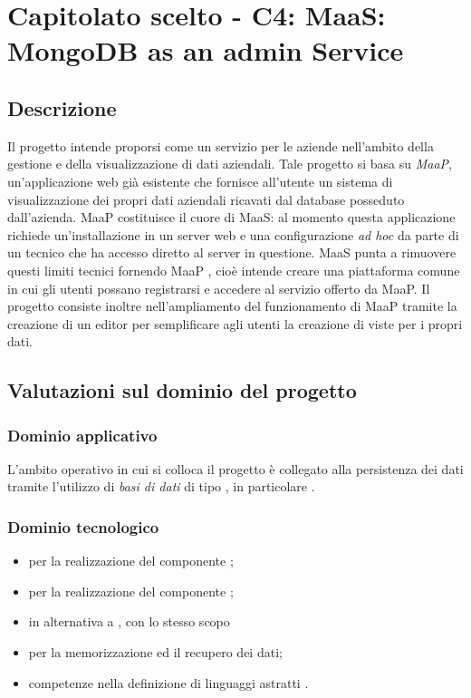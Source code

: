 \section{Capitolato scelto - C4: MaaS: MongoDB as an admin Service}
\subsection{Descrizione}
Il progetto intende proporsi come un servizio per le aziende nell'ambito della gestione e della visualizzazione di dati aziendali. 
Tale progetto si basa su \textit{MaaP}, un'applicazione web gi\`a esistente che fornisce all'utente un sistema di visualizzazione
dei propri dati aziendali ricavati dal database  posseduto dall'azienda.
MaaP costituisce il cuore di MaaS: al momento questa applicazione richiede un'installazione in un server web e 
una configurazione \textit{ad hoc} da parte di un tecnico che ha accesso diretto al server in questione. MaaS punta a rimuovere 
questi limiti tecnici fornendo MaaP , cioè intende creare una piattaforma comune in cui gli utenti possano 
registrarsi e accedere al servizio offerto da MaaP. Il progetto consiste inoltre nell'ampliamento del funzionamento di MaaP tramite la creazione di 
un editor per semplificare agli utenti la creazione di viste per i propri dati.


\subsection{Valutazioni sul dominio del progetto}
\subsubsection{Dominio applicativo}
L'ambito operativo in cui si colloca il progetto \`e collegato alla persistenza dei dati tramite l'utilizzo
di \textit{basi di dati} di tipo , in particolare .

\subsubsection{Dominio tecnologico}
\begin{itemize}
\item \textbf{} per la realizzazione del componente ;
\item \textbf{} per la realizzazione del componente ;
\item \textbf{} in alternativa a , con lo stesso scopo
\item \textbf{} per la memorizzazione ed il recupero dei dati;
\item competenze nella definizione di linguaggi astratti .
\end{itemize}


